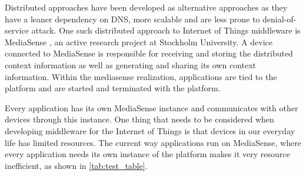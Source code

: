 Distributed approaches have been developed as alternative approaches as they have a leaner dependency on DNS, more scalable and are less prone to denial-of-service attack. One such distributed approach to Internet of Things middleware is MediaSense \cite{Kanter539187}, an active research project at Stockholm University. A device connected to MediaSense is responsible for receiving and storing the distributed context information as well as generating and sharing its own context information. Within the mediasense realization, applications are tied to the platform and are started and terminated with the platform. 

Every application has its own MediaSense instance and communicates with other devices through this instance. One thing that needs to be considered when developing middleware for the  Internet of Things is that devices in our everyday life has limited resources. The current way applications run on MediaSense, where every application needs its own instance of the platform makes it very resource inefficient, as shown in \ref{tab:test_table}.